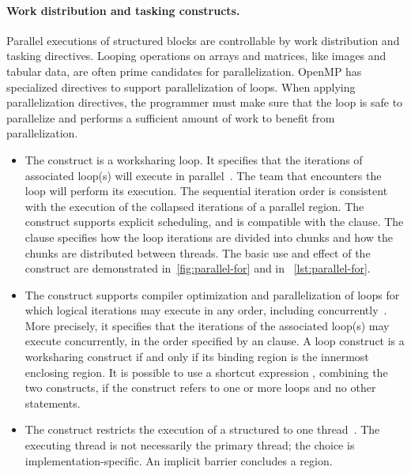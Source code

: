 \paragraph*{Work distribution and tasking constructs.}
Parallel executions of structured blocks are controllable by work distribution and tasking directives.
Looping operations on arrays and matrices, like images and tabular data, are often prime candidates for parallelization.
OpenMP has specialized directives to support parallelization of loops.
When applying parallelization directives, the programmer must make sure that the loop is safe to parallelize and performs a sufficient amount of work to benefit from parallelization.

\begin{itemize}

\item The  construct is a worksharing loop.
It specifies that the iterations of associated loop(s) will execute in parallel~\cite[p. 416]{openmp_api}.
The team that encounters the loop will perform its execution.
The sequential iteration order is consistent with the execution of the collapsed iterations of a parallel  region.
The  construct supports \eg explicit scheduling, and is compatible with the  clause.
The  clause specifies how the loop iterations are divided into chunks and how the chunks are distributed between threads.
The basic use and effect of the  construct are demonstrated in~\autoref{fig:parallel-for} and in ~\autoref{lst:parallel-for}.

\item The  construct
supports compiler optimization and parallelization of loops for which logical iterations may execute in any order, including concurrently~\cite[p. 423--424]{openmp_api}.
More precisely, it specifies that the iterations of the associated loop(s) may execute concurrently, in the order specified by an  clause.
A loop construct is a worksharing construct if and only if its binding region is the innermost enclosing  region.
It is possible to use a shortcut expression , combining the two constructs, if the construct refers to one or more loops and no other statements.

\item The  construct restricts the execution of a structured to one thread~\cite[p. 405]{openmp_api}.
The executing thread is not necessarily the primary thread;
the choice is implementation-specific.
An implicit barrier concludes a  region.

\end{itemize}


